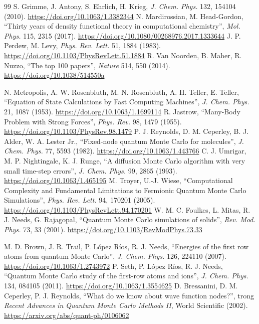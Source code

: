 {\begin{thebibliography}{99}
 S. Grimme, J. Antony, S. Ehrlich, H. Krieg, \emph{J. Chem. Phys.} 132, 154104 (2010). \url{https://doi.org/10.1063/1.3382344}
 N. Mardirossian, M. Head-Gordon, ``Thirty years of density functional theory in computational chemistry'', \emph{Mol. Phys.} 115, 2315 (2017). \url{https://doi.org/10.1080/00268976.2017.1333644}
 J. P. Perdew, M. Levy, \emph{Phys. Rev. Lett.} 51, 1884 (1983). \url{https://doi.org/10.1103/PhysRevLett.51.1884}
 R. Van Noorden, B. Maher, R. Nuzzo, ``The top 100 papers'', \emph{Nature} 514, 550 (2014). \url{https://doi.org/10.1038/514550a}

 N. Metropolis, A. W. Rosenbluth, M. N. Rosenbluth, A. H. Teller, E. Teller, ``Equation of State Calculations by Fast Computing Machines'', \emph{J. Chem. Phys.} 21, 1087 (1953). \url{https://doi.org/10.1063/1.1699114}
 R. Jastrow, ``Many-Body Problem with Strong Forces'', \emph{Phys. Rev.} 98, 1479 (1955). \url{https://doi.org/10.1103/PhysRev.98.1479}
 P. J. Reynolds, D. M. Ceperley, B. J. Alder, W. A. Lester Jr., ``Fixed-node quantum Monte Carlo for molecules'', \emph{J. Chem. Phys.} 77, 5593 (1982). \url{https://doi.org/10.1063/1.443766}
 C. J. Umrigar, M. P. Nightingale, K. J. Runge, ``A diffusion Monte Carlo algorithm with very small time-step errors'', \emph{J. Chem. Phys.} 99, 2865 (1993). \url{https://doi.org/10.1063/1.465195}
 M. Troyer, U.-J. Wiese, ``Computational Complexity and Fundamental Limitations to Fermionic Quantum Monte Carlo Simulations'', \emph{Phys. Rev. Lett.} 94, 170201 (2005). \url{https://doi.org/10.1103/PhysRevLett.94.170201}
 W. M. C. Foulkes, L. Mitas, R. J. Needs, G. Rajagopal, ``Quantum Monte Carlo simulations of solids'', \emph{Rev. Mod. Phys.} 73, 33 (2001). \url{https://doi.org/10.1103/RevModPhys.73.33}

 M. D. Brown, J. R. Trail, P. López Ríos, R. J. Needs, ``Energies of the first row atoms from quantum Monte Carlo'', \emph{J. Chem. Phys.} 126, 224110 (2007). \url{https://doi.org/10.1063/1.2743972}
 P. Seth, P. López Ríos, R. J. Needs, ``Quantum Monte Carlo study of the first-row atoms and ions'', \emph{J. Chem. Phys.} 134, 084105 (2011). \url{https://doi.org/10.1063/1.3554625}
 D. Bressanini, D. M. Ceperley, P. J. Reynolds, ``What do we know about wave function nodes?'', trong \emph{Recent Advances in Quantum Monte Carlo Methods II}, World Scientific (2002). \url{https://arxiv.org/abs/quant-ph/0106062}


\end{thebibliography}}
